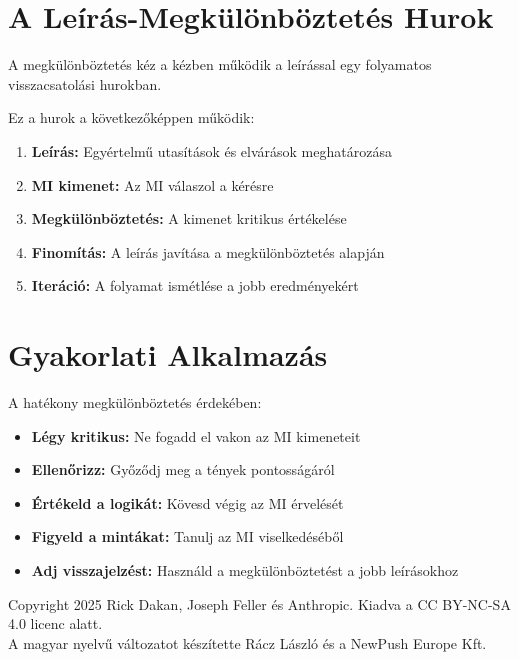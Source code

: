 \documentclass[a4paper, 11pt]{article}
\newenvironment{customquote}
  {\begin{tcolorbox}[
    left=4mm,
    right=4mm,
    top=4mm,
    bottom=4mm,
    colback=lightgray,
    colframe=accent,
    leftrule=4mm,
    rightrule=0mm,
    toprule=0mm,
    bottomrule=0mm,
    arc=2mm,
    outer arc=2mm
  ]}
  {\end{tcolorbox}}
\begin{document}
\section{A Leírás-Megkülönböztetés Hurok}

\begin{customquote}
A megkülönböztetés kéz a kézben működik a leírással egy folyamatos visszacsatolási hurokban.
\end{customquote}

Ez a hurok a következőképpen működik:

\begin{enumerate}
\item \textbf{Leírás:} Egyértelmű utasítások és elvárások meghatározása
\item \textbf{MI kimenet:} Az MI válaszol a kérésre
\item \textbf{Megkülönböztetés:} A kimenet kritikus értékelése
\item \textbf{Finomítás:} A leírás javítása a megkülönböztetés alapján
\item \textbf{Iteráció:} A folyamat ismétlése a jobb eredményekért
\end{enumerate}

\section{Gyakorlati Alkalmazás}

A hatékony megkülönböztetés érdekében:

\begin{itemize}
\item \textbf{Légy kritikus:} Ne fogadd el vakon az MI kimeneteit
\item \textbf{Ellenőrizz:} Győződj meg a tények pontosságáról
\item \textbf{Értékeld a logikát:} Kövesd végig az MI érvelését
\item \textbf{Figyeld a mintákat:} Tanulj az MI viselkedéséből
\item \textbf{Adj visszajelzést:} Használd a megkülönböztetést a jobb leírásokhoz
\end{itemize}

\vfill
\begin{center}
\small
Copyright 2025 Rick Dakan, Joseph Feller és Anthropic. Kiadva a CC BY-NC-SA 4.0 licenc alatt.\\A magyar nyelvű változatot készítette Rácz László és a NewPush Europe Kft.
\end{center}
\end{document}
